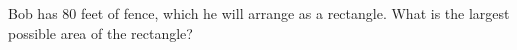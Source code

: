 Bob has $80$ feet of fence, which he will arrange as a rectangle. What is the largest possible area of the rectangle?
